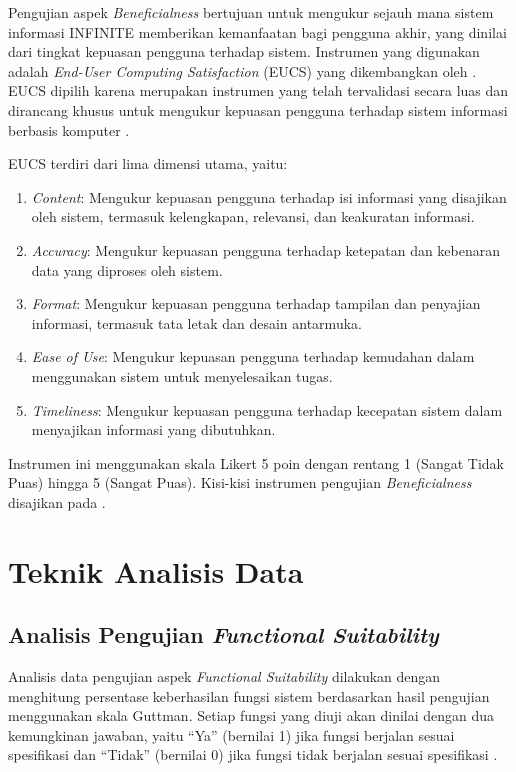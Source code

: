 Pengujian aspek \textit{Beneficialness} bertujuan untuk mengukur sejauh mana sistem informasi INFINITE memberikan kemanfaatan bagi pengguna akhir, yang dinilai dari tingkat kepuasan pengguna terhadap sistem. Instrumen yang digunakan adalah \textit{End-User Computing Satisfaction} (EUCS) yang dikembangkan oleh \citet{Doll_Torkzadeh_1988_EUCS}. EUCS dipilih karena merupakan instrumen yang telah tervalidasi secara luas dan dirancang khusus untuk mengukur kepuasan pengguna terhadap sistem informasi berbasis komputer \citep{Hidayah_2020_EUCS}.

EUCS terdiri dari lima dimensi utama, yaitu:
\begin{enumerate}[label=\alph*.]
	\item \textit{Content}: Mengukur kepuasan pengguna terhadap isi informasi yang disajikan oleh sistem, termasuk kelengkapan, relevansi, dan keakuratan informasi.
	\item \textit{Accuracy}: Mengukur kepuasan pengguna terhadap ketepatan dan kebenaran data yang diproses oleh sistem.
	\item \textit{Format}: Mengukur kepuasan pengguna terhadap tampilan dan penyajian informasi, termasuk tata letak dan desain antarmuka.
	\item \textit{Ease of Use}: Mengukur kepuasan pengguna terhadap kemudahan dalam menggunakan sistem untuk menyelesaikan tugas.
	\item \textit{Timeliness}: Mengukur kepuasan pengguna terhadap kecepatan sistem dalam menyajikan informasi yang dibutuhkan.
\end{enumerate}

Instrumen ini menggunakan skala Likert 5 poin dengan rentang 1 (Sangat Tidak Puas) hingga 5 (Sangat Puas). Kisi-kisi instrumen pengujian \textit{Beneficialness} disajikan pada .

\section{Teknik Analisis Data}

\subsection{Analisis Pengujian \textit{Functional Suitability}}

Analisis data pengujian aspek \textit{Functional Suitability} dilakukan dengan menghitung persentase keberhasilan fungsi sistem berdasarkan hasil pengujian menggunakan skala Guttman. Setiap fungsi yang diuji akan dinilai dengan dua kemungkinan jawaban, yaitu ``Ya'' (bernilai 1) jika fungsi berjalan sesuai spesifikasi dan ``Tidak'' (bernilai 0) jika fungsi tidak berjalan sesuai spesifikasi \citep{Lamada_2020_ISO25010}.

